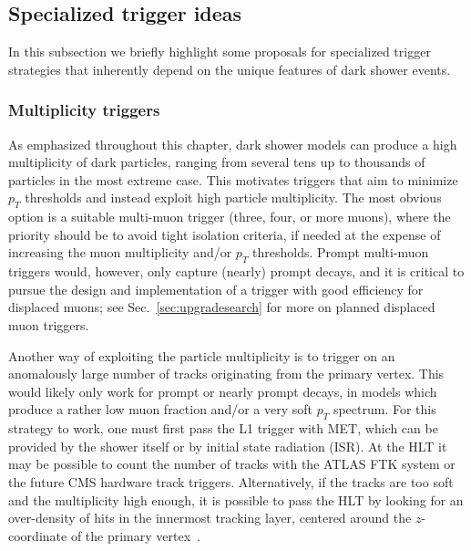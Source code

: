 \subsection{Specialized trigger ideas}

In this subsection we briefly highlight some proposals for specialized trigger strategies that inherently depend on the unique features of dark shower events.

\subsubsection{Multiplicity triggers}
\label{sec:darkshowertrigmultiplicity}

As emphasized throughout this chapter, dark shower models can produce a high multiplicity of dark particles, ranging from several tens up to thousands of particles in the most extreme case. This motivates triggers that aim to minimize $p_T$ thresholds and instead exploit high particle multiplicity. The most obvious option is a suitable multi-muon trigger (three, four, or more muons), where the priority should be to avoid tight isolation criteria, if needed at the expense of increasing the muon multiplicity and/or $p_T$ thresholds. Prompt multi-muon triggers would, however, only capture (nearly) prompt decays, and it is critical to pursue the design and implementation of a trigger with good efficiency for displaced muons; see Sec.~\ref{sec:upgradesearch} for more on planned displaced muon triggers.

Another way of exploiting the particle multiplicity is to trigger on an anomalously large number of tracks originating from the primary vertex. This would likely only work for prompt or nearly prompt decays, in models which produce a rather low muon fraction and/or a very soft $p_T$ spectrum. For this strategy to work, one must first pass the L1 trigger with MET, which can be provided by the shower itself or by initial state radiation (ISR). At the HLT it may be possible to count the number of tracks with the ATLAS FTK system or the future CMS hardware track triggers. Alternatively, if the tracks are too soft and the multiplicity high enough, it is possible to pass the HLT by looking for an over-density of hits in the innermost tracking layer, centered around the $z$-coordinate of the primary vertex~\cite{Knapen:2016hky}.

